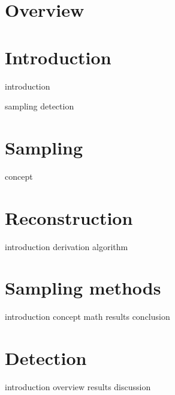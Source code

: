 \documentclass[a4paper, openany, oneside]{memoir}
\begin{document}
\chapter{Overview}

\chapter{Introduction}
{introduction}

{sampling}
{detection}


\chapter{Sampling}
\label{cha:sampling}

{concept}

\chapter{Reconstruction}
\label{cha:reconstruction}

{introduction}
{derivation}
{algorithm}

\chapter{Sampling methods}
\label{cha:sampling_methods}

{introduction}
{concept}
{math} 
{results}
{conclusion}


\chapter{Detection}

{introduction}
{overview}
{results}
{discussion}
\end{document}
